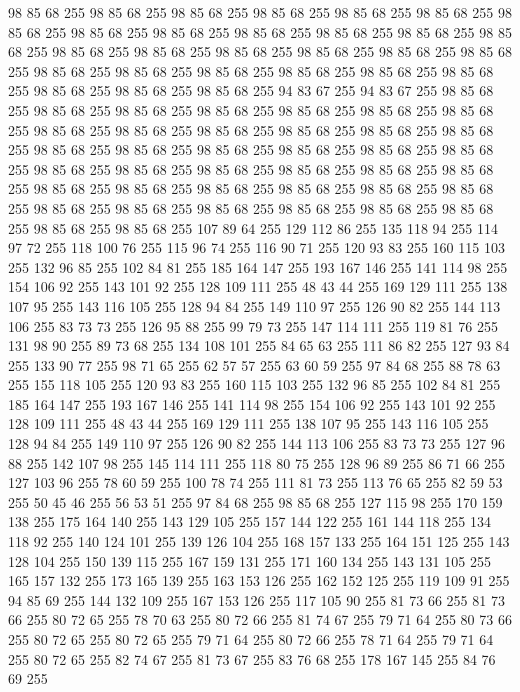 98 85 68 255 98 85 68 255 98 85 68 255 98 85 68 255 98 85 68 255 98 85 68 255 98 85 68 255 98 85 68 255 98 85 68 255 98 85 68 255 98 85 68 255 98 85 68 255 98 85 68 255 98 85 68 255 98 85 68 255 98 85 68 255 98 85 68 255 98 85 68 255 98 85 68 255 98 85 68 255 98 85 68 255 98 85 68 255 98 85 68 255 98 85 68 255 98 85 68 255 98 85 68 255 98 85 68 255 98 85 68 255 94 83 67 255 94 83 67 255 98 85 68 255 98 85 68 255 98 85 68 255 98 85 68 255 98 85 68 255 98 85 68 255 98 85 68 255 98 85 68 255 98 85 68 255 98 85 68 255 98 85 68 255 98 85 68 255 98 85 68 255 98 85 68 255 98 85 68 255 98 85 68 255 98 85 68 255 98 85 68 255 98 85 68 255 98 85 68 255 98 85 68 255 98 85 68 255 98 85 68 255 98 85 68 255 98 85 68 255 98 85 68 255 98 85 68 255 98 85 68 255 98 85 68 255 98 85 68 255 98 85 68 255 98 85 68 255 98 85 68 255 98 85 68 255
98 85 68 255 98 85 68 255 98 85 68 255 98 85 68 255 98 85 68 255 107 89 64 255 129 112 86 255 135 118 94 255 114 97 72 255 118 100 76 255 115 96 74 255 116 90 71 255 120 93 83 255 160 115 103 255 132 96 85 255 102 84 81 255 185 164 147 255 193 167 146 255 141 114 98 255 154 106 92 255 143 101 92 255 128 109 111 255 48 43 44 255 169 129 111 255 138 107 95 255 143 116 105 255 128 94 84 255 149 110 97 255 126 90 82 255 144 113 106 255 83 73 73 255 126 95 88 255 99 79 73 255 147 114 111 255 119 81 76 255 131 98 90 255 89 73 68 255 134 108 101 255 84 65 63 255 111 86 82 255 127 93 84 255 133 90 77 255 98 71 65 255 62 57 57 255 63 60 59 255 97 84 68 255 88 78 63 255 155 118 105 255 120 93 83 255 160 115 103 255 132 96 85 255 102 84 81 255 185 164 147 255 193 167 146 255 141 114 98 255 154 106 92 255 143 101 92 255 128 109 111 255 48 43 44 255 169 129 111 255 138 107 95 255 143 116 105 255 128 94 84 255 149 110 97 255
126 90 82 255 144 113 106 255 83 73 73 255 127 96 88 255 142 107 98 255 145 114 111 255 118 80 75 255 128 96 89 255 86 71 66 255 127 103 96 255 78 60 59 255 100 78 74 255 111 81 73 255 113 76 65 255 82 59 53 255 50 45 46 255 56 53 51 255 97 84 68 255 98 85 68 255 127 115 98 255 170 159 138 255 175 164 140 255 143 129 105 255 157 144 122 255 161 144 118 255 134 118 92 255 140 124 101 255 139 126 104 255 168 157 133 255 164 151 125 255 143 128 104 255 150 139 115 255 167 159 131 255 171 160 134 255 143 131 105 255 165 157 132 255 173 165 139 255 163 153 126 255 162 152 125 255 119 109 91 255 94 85 69 255 144 132 109 255 167 153 126 255 117 105 90 255 81 73 66 255 81 73 66 255 80 72 65 255 78 70 63 255 80 72 66 255 81 74 67 255 79 71 64 255 80 73 66 255 80 72 65 255 80 72 65 255 79 71 64 255 80 72 66 255 78 71 64 255 79 71 64 255 80 72 65 255 82 74 67 255 81 73 67 255 83 76 68 255 178 167 145 255 84 76 69 255
